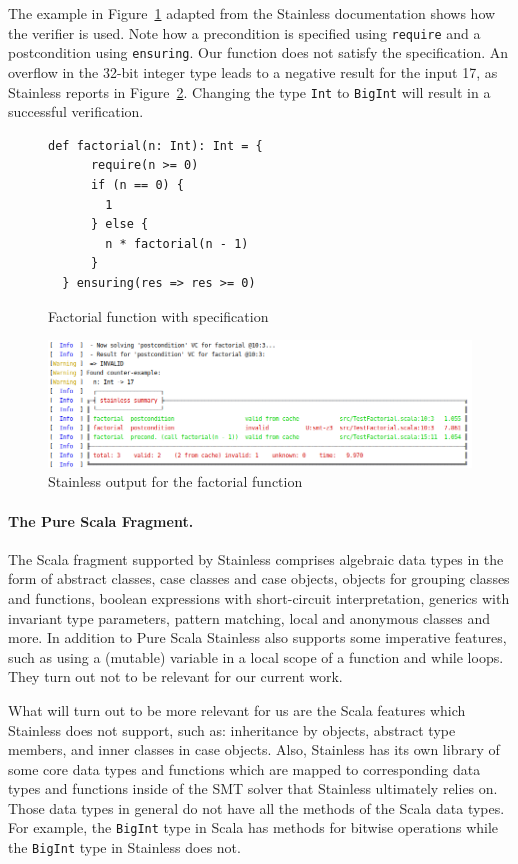 \documentclass[hyphens, a4paper,USenglish,cleveref, autoref, thm-restate]{oasics-v2019}
\begin{document}
The example in Figure~\ref{fig:factorial} adapted from the Stainless
documentation \cite{Stainless:documentation} shows how the verifier is
used. Note how a precondition is specified using \texttt{require} and
a postcondition using \texttt{ensuring}. Our function does not satisfy
the specification. An overflow in the 32-bit integer type leads to a
negative result for the input 17, as Stainless reports in
Figure~\ref{fig:failed}. Changing the type \texttt{Int} to
\texttt{BigInt} will result in a successful verification.


\begin{figure}
\begin{lstlisting}[style=scala]
  def factorial(n: Int): Int = {
      require(n >= 0)
      if (n == 0) {
        1
      } else {
        n * factorial(n - 1)
      }
  } ensuring(res => res >= 0)
\end{lstlisting}
	\caption{Factorial function with specification}
	\label{fig:factorial}
\end{figure}

\begin{figure}
	\centering
		\includegraphics[width=\textwidth]{output1.png}
	\caption{Stainless output for the factorial function}
	\label{fig:failed}
\end{figure}


\paragraph{The Pure Scala Fragment.} The Scala fragment supported by
Stainless comprises algebraic data types in the form of abstract
classes, case classes and case objects, objects for grouping classes
and functions, boolean expressions with short-circuit interpretation,
generics with invariant type parameters, pattern matching, local and
anonymous classes and more.  In addition to Pure Scala Stainless also
supports some imperative features, such as using a (mutable) variable
in a local scope of a function and while loops. They turn out not to
be relevant for our current work.

What will turn out to be more relevant for us are the Scala features
which Stainless does not support, such as: inheritance by objects,
abstract type members, and inner classes in case objects. Also,
Stainless has its own library of some core data types and functions
which are mapped to corresponding data types and functions inside of
the SMT solver that Stainless ultimately relies on. Those data types
in general do not have all the methods of the Scala data types. For
example, the \texttt{BigInt} type in Scala has methods for bitwise
operations while the \texttt{BigInt} type in Stainless does not.
\end{document}
